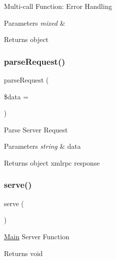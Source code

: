 Multi-\/call Function\+: Error Handling


\begin{DoxyParams}{Parameters}
{\em mixed} & \\
\hline
\end{DoxyParams}
\begin{DoxyReturn}{Returns}
object 
\end{DoxyReturn}
\mbox{\label{class_c_i___xmlrpcs_a8a0c34554b9238be766ab85f55519b6e}} 
\subsubsection{\texorpdfstring{parse\+Request()}{parseRequest()}}
{\footnotesize\ttfamily parse\+Request (\begin{DoxyParamCaption}\item[{}]{\$data = {\ttfamily \textquotesingle{}\textquotesingle{}} }\end{DoxyParamCaption})}

Parse Server Request


\begin{DoxyParams}{Parameters}
{\em string} & data \\
\hline
\end{DoxyParams}
\begin{DoxyReturn}{Returns}
object xmlrpc response 
\end{DoxyReturn}
\mbox{\label{class_c_i___xmlrpcs_aa9e0b443b9575f62bf9f8e85b1742c96}} 
\subsubsection{\texorpdfstring{serve()}{serve()}}
{\footnotesize\ttfamily serve (\begin{DoxyParamCaption}{ }\end{DoxyParamCaption})}

\mbox{\hyperlink{class_main}{Main}} Server Function

\begin{DoxyReturn}{Returns}
void 
\end{DoxyReturn}
\mbox{\label{class_c_i___xmlrpcs_a858a05529612358b8f63c88b08b414d0}} 
